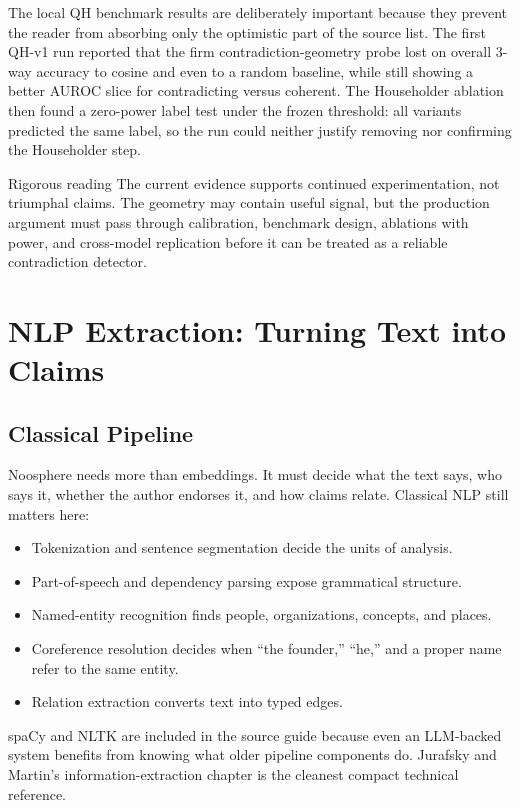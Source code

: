 \documentclass[11pt]{article}
\begin{document}
The local QH benchmark results are deliberately important because they prevent
the reader from absorbing only the optimistic part of the source list. The first
QH-v1 run reported that the firm contradiction-geometry probe lost on overall
3-way accuracy to cosine and even to a random baseline, while still showing a
better AUROC slice for contradicting versus coherent. The Householder ablation
then found a zero-power label test under the frozen threshold: all variants
predicted the same label, so the run could neither justify removing nor
confirming the Householder step.

\begin{readerbox}{Rigorous reading}
The current evidence supports continued experimentation, not triumphal claims.
The geometry may contain useful signal, but the production argument must pass
through calibration, benchmark design, ablations with power, and cross-model
replication before it can be treated as a reliable contradiction detector.
\end{readerbox}

\section{NLP Extraction: Turning Text into Claims}

\subsection{Classical Pipeline}

Noosphere needs more than embeddings. It must decide what the text says, who
says it, whether the author endorses it, and how claims relate. Classical NLP
still matters here:

\begin{itemize}
\item Tokenization and sentence segmentation decide the units of analysis.
\item Part-of-speech and dependency parsing expose grammatical structure.
\item Named-entity recognition finds people, organizations, concepts, and
places.
\item Coreference resolution decides when ``the founder,'' ``he,'' and a proper
name refer to the same entity.
\item Relation extraction converts text into typed edges.
\end{itemize}

spaCy and NLTK are included in the source guide because even an LLM-backed
system benefits from knowing what older pipeline components do. Jurafsky and
Martin's information-extraction chapter is the cleanest compact technical
reference.
\end{document}
